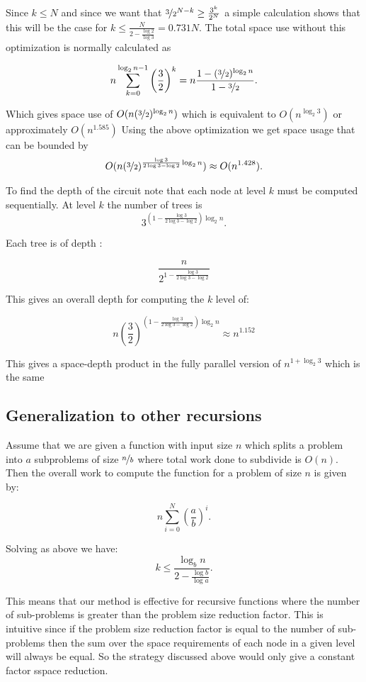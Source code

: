 Since $k\leq N$ and since we want that $\nicefrac{3}{2}^{N-k} \geq
\frac{3^k}{2^N}$ a simple calculation shows that this will be the case for $k
\leq \frac{N}{ 2- \frac{\log 2}{\log 3}} = 0.731N$. The total space use without
this optimization is normally calculated as

\[
    n\sum_{k=0}^{\log_2 n - 1} \left(\frac{3}{2}\right)^k = n\frac{1-(\nicefrac{3}{2})^{\log_2 n}}{1-\nicefrac{3}{2}}.
\]

Which gives space use of $O(n(\nicefrac{3}{2})^{\log_2 n})$ which is
equivalent to $O(n^{\log_2 3})$ or approximately $O(n^{1.585})$
Using the above optimization we get space usage that can be bounded by
\[
    O(n(\nicefrac{3}{2})^{\frac{\log 3}{ 2\log 3 - \log 2}\log_2 n}) \approx O(n^{1.428}).
\]

To find the depth of the circuit note that each node at level $k$ must be
computed sequentially. At level $k$ the number of trees is
\[
    3^{\left(1-\frac{\log 3}{ 2\log 3 - \log 2}\right)\log_2 n}.
\]

Each tree is of depth :

\[
    \frac{n}{2^{1-\frac{\log 3}{ 2\log 3 - \log 2}}}
\]

This gives an overall depth for computing the $k$ level of:

\[
    n\left(\frac{3}{2}\right)^{\left(1-\frac{\log 3}{ 2\log 3 - \log 2}\right)\log_2 n} \approx n^{1.152}
\]

This gives a space-depth product in the fully parallel version of $n^{1+\log_2
3}$ which is the same

\subsection{Generalization to other recursions}

Assume that we are given a function with input size $n$ which splits a problem
into $a$ subproblems of size $\nicefrac{n}{b}$ where total work done to
subdivide is $O(n)$. Then the overall work to compute the function for a
problem of size $n$ is given by:

\[
    n\sum_{i=0}^{N} \left(\frac{a}{b}\right)^i.
\]

Solving as above we have:
\[
    k \leq \frac{\log_b n}{ 2- \frac{\log b}{\log a}}.
\]

This means that our method is effective for recursive functions where the
number of sub-problems is greater than the problem size reduction factor. This
is intuitive since if the problem size reduction factor is equal to the number
of sub-problems then the sum over the space requirements of each node in a
given level will always be equal. So the strategy discussed above would only
give a constant factor sspace reduction.


